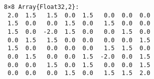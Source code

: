 \documentclass[11pt]{article}
\begin{document}
    
    \begin{verbatim}
8×8 Array{Float32,2}:
 2.0  1.5   1.5  0.0  1.5   0.0  0.0  0.0
 1.5  0.0   0.0  1.5  0.0   1.5  0.0  0.0
 1.5  0.0  -2.0  1.5  0.0   0.0  1.5  0.0
 0.0  1.5   1.5  0.0  0.0   0.0  0.0  1.5
 1.5  0.0   0.0  0.0  0.0   1.5  1.5  0.0
 0.0  1.5   0.0  0.0  1.5  -2.0  0.0  1.5
 0.0  0.0   1.5  0.0  1.5   0.0  0.0  1.5
 0.0  0.0   0.0  1.5  0.0   1.5  1.5  2.0
    \end{verbatim}

    

    
    
    
    
\end{document}
